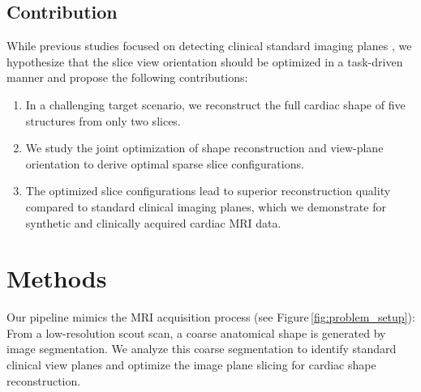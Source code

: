     \subsection{Contribution}
    \label{sec:contribution}
    While previous studies focused on detecting clinical standard imaging planes \citep{beetz2022reconstructing,natalia2022automated,nitta2014automatic}, we hypothesize that the slice view orientation should be optimized in a task-driven manner and propose the following contributions:

    \begin{enumerate}
        \item In a challenging target scenario, we reconstruct the full cardiac shape of five structures from only two slices.
        \item We study the joint optimization of shape reconstruction and view-plane orientation to derive optimal sparse slice configurations.
        \item The optimized slice configurations lead to superior reconstruction quality compared to standard clinical imaging planes, which we demonstrate for synthetic and clinically acquired cardiac MRI data.
    \end{enumerate}

\section{Methods}
    \label{sec:method}
     Our pipeline mimics the MRI acquisition process (see Figure\,\ref{fig:problem_setup}): From a low-resolution scout scan, a coarse anatomical shape is generated by image segmentation.
    We analyze this coarse segmentation to identify standard clinical view planes and optimize the image plane slicing for cardiac shape reconstruction.
